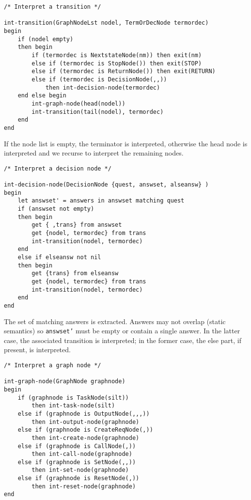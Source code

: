 \begin{verbatim}
/* Interpret a transition */

int-transition(GraphNodeLst nodel, TermOrDecNode termordec)
begin
    if (nodel empty)
    then begin
        if (termordec is NextstateNode(nm)) then exit(nm)
        else if (termordec is StopNode()) then exit(STOP)
        else if (termordec is ReturnNode()) then exit(RETURN)
        else if (termordec is DecisionNode(,,))
            then int-decision-node(termordec)
    end else begin
        int-graph-node(head(nodel))
        int-transition(tail(nodel), termordec)
    end
end
\end{verbatim}

If the node list is empty, the terminator is interpreted, otherwise
the head node is interpreted and we recurse to interpret the
remaining nodes.

\begin{verbatim}
/* Interpret a decision node */

int-decision-node(DecisionNode {quest, answset, alseansw} )
begin
    let answset' = answers in answset matching quest
    if (answset not empty)
    then begin
        get { ,trans} from answset
        get {nodel, termordec} from trans
        int-transition(nodel, termordec)
    end 
    else if elseansw not nil
    then begin
        get {trans} from elseansw
        get {nodel, termordec} from trans
        int-transition(nodel, termordec)
    end
end
\end{verbatim}

The set of matching answers is extracted. Answers may not overlap
(static semantics) so {\tt answset'} must be empty or contain a
single answer. In the latter case, the associated transition is
interpreted; in the former case, the else part, if present, is
interpreted.

\begin{verbatim}
/* Interpret a graph node */

int-graph-node(GraphNode graphnode)
begin
    if (graphnode is TaskNode(silt))
        then int-task-node(silt)
    else if (graphnode is OutputNode(,,,))
        then int-output-node(graphnode)
    else if (graphnode is CreateReqNode(,))
        then int-create-node(graphnode)
    else if (graphnode is CallNode(,))
        then int-call-node(graphnode)
    else if (graphnode is SetNode(,,))
        then int-set-node(graphnode)
    else if (graphnode is ResetNode(,))
        then int-reset-node(graphnode)
end
\end{verbatim}

